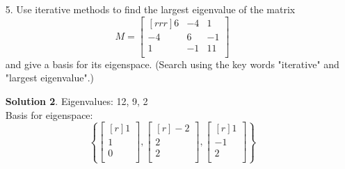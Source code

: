 \documentclass[12pt]{article}
\theoremstyle{definition}
\newtheorem*{solution}{Solution} %
\theoremstyle{plain}
\begin{document}
\begin{enumerate}
\begin{solution}
\begin{align*}
	&+
	\begin{bmatrix}[rrrrr]
	274&274&274&274&274\\
	0&548&274&274&274\\
	0&0&822&274&274\\
	0&0&0&1096&274\\
	0&0&0&0&1370\\\end{bmatrix}\\
	&+
	\begin{bmatrix}[rrrrr]
	-120&0&0&0&0\\
	0&-120&0&0&0\\
	0&0&-120&0&0\\
	0&0&0&-120&0\\
	0&0&0&0&-120\\\end{bmatrix}
\end{align*}

\end{solution}


\item[5.] Use iterative methods to find the largest eigenvalue of the matrix
\[ M = \begin{bmatrix}[rrr]6&-4&1\\-4&6&-1\\1&-1&11\\\end{bmatrix} \]
and give a basis for its eigenspace. (Search using the key words "iterative" and "largest eigenvalue".)
\begin{solution}
Eigenvalues: 12, 9, 2\\
Basis for eigenspace:  
\[ \left\{ \begin{bmatrix}[r]1\\1\\0\\\end{bmatrix},\begin{bmatrix}[r]-2\\2\\2\\\end{bmatrix},\begin{bmatrix}[r]1\\-1\\2\\\end{bmatrix} \right\} \]
\end{solution}
\end{enumerate}
\end{document}
